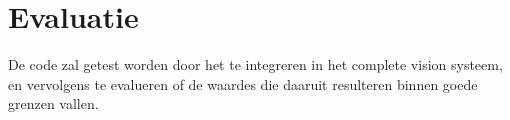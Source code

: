 \documentclass[11pt]{article}
\begin{document}
    \section{Evaluatie}\label{sec:evaluatie}
    De code zal getest worden door het te integreren in het complete vision systeem, en
    vervolgens te evalueren of de waardes die daaruit resulteren binnen goede grenzen vallen.
\end{document}

